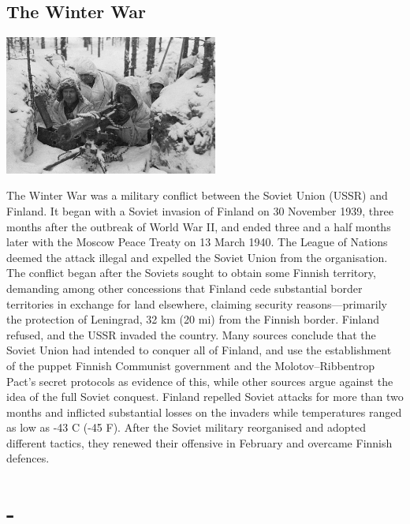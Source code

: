 \documentclass[11pt]{report}
\begin{document}
\subsection{The Winter War}
\vspace{2mm}\begin{center}\includegraphics[width=7cm]{./img/winterWar.jpg}\end{center}
The Winter War was a military conflict between the Soviet Union (USSR) and Finland. It began with a Soviet invasion of Finland on 30 November 1939, three months after the outbreak of World War II, and ended three and a half months later with the Moscow Peace Treaty on 13 March 1940. The League of Nations deemed the attack illegal and expelled the Soviet Union from the organisation.\\
\indent The conflict began after the Soviets sought to obtain some Finnish territory, demanding among other concessions that Finland cede substantial border territories in exchange for land elsewhere, claiming security reasons—primarily the protection of Leningrad, 32 km (20 mi) from the Finnish border. Finland refused, and the USSR invaded the country. Many sources conclude that the Soviet Union had intended to conquer all of Finland, and use the establishment of the puppet Finnish Communist government and the Molotov–Ribbentrop Pact's secret protocols as evidence of this, while other sources argue against the idea of the full Soviet conquest. Finland repelled Soviet attacks for more than two months and inflicted substantial losses on the invaders while temperatures ranged as low as -43 C (-45 F). After the Soviet military reorganised and adopted different tactics, they renewed their offensive in February and overcame Finnish defences.
\section{-}
\end{document}
